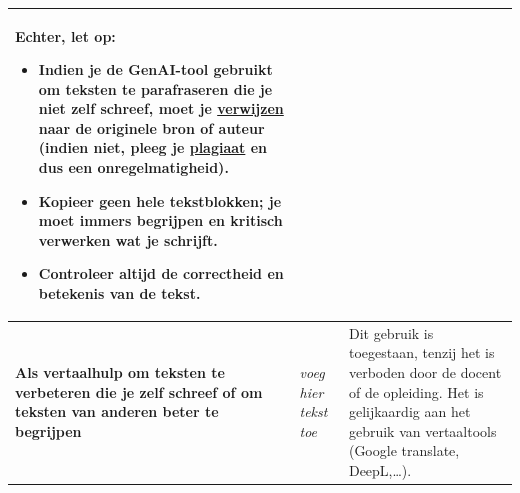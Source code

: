 \begin{longtable}{|p{}|p{}|p{}|}
\textbf{Echter, let op:} 
\begin{itemize}
    \item Indien je de GenAI-tool gebruikt om teksten te parafraseren die je niet zelf schreef, \textbf{moet} je \href{https://bib.kuleuven.be/training-en-tutorials/citeren/basisprincipes}{verwijzen} naar \textbf{de originele bron of auteur }(indien niet, pleeg je \href{https://www.kuleuven.be/onderwijs/plagiaat/index}{plagiaat} en dus een onregelmatigheid).
    \item \textbf{Kopieer geen hele tekstblokken}; je moet immers begrijpen en kritisch verwerken wat je schrijft.
    \item Controleer altijd de correctheid en betekenis van de tekst.
\end{itemize} \\ \hline
\textbf{Als vertaalhulp om teksten te verbeteren die je zelf schreef of om teksten van anderen beter te begrijpen} & \textit{voeg hier tekst toe} & Dit gebruik is toegestaan, tenzij het is verboden door de docent of de opleiding. Het is gelijkaardig aan het gebruik van vertaaltools (Google translate, DeepL,…).


\end{longtable}
